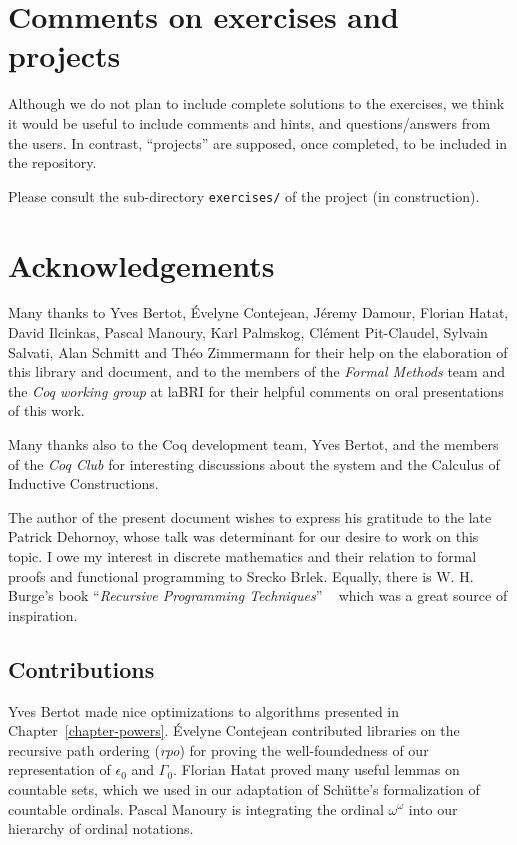 \documentclass[a4paper]{book}
\begin{document}
\section{Comments on exercises and projects}

Although we do not plan to include complete solutions to the exercises, 
we think it would be useful to include comments and hints, and questions/answers from the users. In contrast, ``projects'' are supposed, once completed, to be included in the repository.

Please consult the sub-directory \texttt{exercises/} of the
 project (in construction).

\section{Acknowledgements}
\label{sec:orgheadline5}
    Many thanks to Yves Bertot, \'Evelyne Contejean, Jéremy Damour,   Florian Hatat,  David Ilcinkas, 
Pascal Manoury,  Karl Palmskog, Cl\'ement Pit-Claudel, Sylvain Salvati, Alan Schmitt and Théo Zimmermann for their help on the elaboration of this library and  document, and to the
 members of the \emph{Formal Methods} team and the \emph{Coq working group} at laBRI for their helpful comments 
on  oral presentations of this work. 

Many thanks also to the Coq development team, Yves Bertot, and the members of the \emph{Coq Club} for interesting discussions about the \coq{} system and the Calculus of Inductive Constructions.

The author of the present document wishes to express his gratitude to the late Patrick Dehornoy, whose talk  was determinant for our desire to work on this topic.
I owe my interest in discrete mathematics and their relation to formal proofs and functional programming  to Srecko Brlek.  Equally, there is W. H. Burge's book ``\emph{Recursive Programming Techniques}'' ~\cite{burge} which was a great  source of inspiration.



\subsection{Contributions}

Yves Bertot made nice optimizations  to algorithms presented in Chapter~\ref{chapter-powers}.
\'Evelyne Contejean contributed libraries on the recursive path ordering (\emph{rpo}) for proving the well-foundedness of our representation of $\epsilon_0$ and $\Gamma_0$.
Florian Hatat proved many useful lemmas on countable sets, which we used in our adaptation of Schütte's formalization of countable ordinals. Pascal Manoury is integrating the ordinal $\omega^\omega$ into our hierarchy of ordinal notations.
\end{document}
